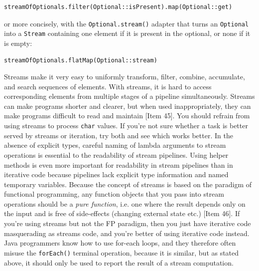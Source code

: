 \documentclass[table, xcdraw]{article}%
\begin{document}
\begin{verbatim}
streamOfOptionals.filter(Optional::isPresent).map(Optional::get)
\end{verbatim}

or more concisely, with the \texttt{Optional.stream()} adapter that turns an \texttt{Optional} into a \texttt{Stream} containing one element if it is present in the optional, or none if it is empty:

\begin{verbatim}
streamOfOptionals.flatMap(Optional::stream)
\end{verbatim}

Streams make it very easy to uniformly transform, filter, combine, accumulate, and search sequences of elements. With streams, it is hard to access corresponding elements from multiple stages of a pipeline simultaneously. Streams can make programs shorter and clearer, but when used inappropriately, they can make programs difficult to read and maintain [Item 45]. You should refrain from using streams to process \texttt{char} values. If you’re not sure whether a task is better served by streams or iteration, try both and see which works better. In the absence of explicit types, careful naming of lambda arguments to stream operations is essential to the readability of stream pipelines. Using helper methods is even more important for readability in stream pipelines than in iterative code because pipelines lack explicit type information and named temporary variables. Because the concept of streams is based on the paradigm of functional programming, any function objects that you pass into stream operations should be a \emph{pure function}, i.e. one where the result depends only on the input and is free of side-effects (changing external state etc.) [Item 46]. If you're using streams but not the FP paradigm, then you just have iterative code masquerading as streams code, and you're better of using iterative code instead. Java programmers know how to use for-each loops, and they therefore often misuse the \texttt{forEach()} terminal operation, because it is similar, but as stated above, it should only be used to report the result of a stream computation.
\end{document}
